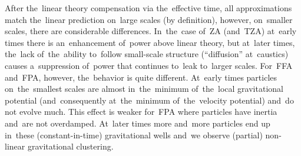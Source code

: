 After the~linear theory compensation via the~effective time, all approximations match the~linear prediction on~large scales (by definition), however, on~smaller scales, there are considerable differences. In~the~case of~ZA (and~TZA) at~early times there is an~enhancement of~power above linear theory, but at~later times, the~lack of~the~ability to~follow small-scale structure (``diffusion'' at~caustics) causes a~suppression of~power that continues to~leak to~larger scales. For~FFA and~FPA, however, the~behavior is quite different. At~early times particles on~the~smallest scales are almost in~the~minimum of~the~local gravitational potential (and~consequently at~the~minimum of~the~velocity potential) and~do not evolve much. This effect is weaker for~FPA where particles have inertia and~are not overdamped. At~later times more and~more particles end up in~these (constant-in-time) gravitational wells and~we observe (partial) non-linear gravitational clustering.
